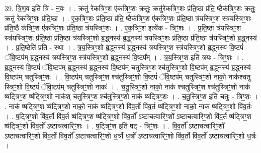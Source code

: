 \documentclass[17pt]{extarticle}
\begin{document}
39. त्रि॒ण॒व इति॑ त्रि - न॒वः । . क्रतु॑ रेकत्रिꣳ॒॒श ए॑कत्रिꣳ॒॒शः क्रतुः॒ क्रतु॑रेकत्रिꣳ॒॒शः प्र॑ति॒ष्ठा प्र॑ति॒ ष्ठैक॑त्रिꣳ॒॒शः क्रतुः॒ क्रतु॑ रेकत्रिꣳ॒॒शः प्र॑ति॒ष्ठा । . ए॒क॒त्रिꣳ॒॒शः प्र॑ति॒ष्ठा प्र॑ति॒ ष्ठैक॑त्रिꣳ॒॒श ए॑कत्रिꣳ॒॒शः प्र॑ति॒ष्ठा 
त्र॑यस्त्रिꣳ॒॒श स्त्र॑यस्त्रिꣳ॒॒शः प्र॑ति॒ष्ठै क॑त्रिꣳ॒॒श ए॑कत्रिꣳ॒॒शः प्र॑ति॒ष्ठा त्र॑यस्त्रिꣳ॒॒शः । . ए॒क॒त्रिꣳ॒॒श इत्ये॑क - त्रिꣳ॒॒शः । . प्र॒ति॒ष्ठा त्र॑यस्त्रिꣳ॒॒श स्त्र॑यस्त्रिꣳ॒॒शः प्र॑ति॒ष्ठा प्र॑ति॒ष्ठा त्र॑यस्त्रिꣳ॒॒शो ब्र॒द्ध्नस्य॑ ब्र॒द्ध्नस्य॑ त्रयस्त्रिꣳ॒॒शः प्र॑ति॒ष्ठा प्र॑ति॒ष्ठा त्र॑यस्त्रिꣳ॒॒शो ब्र॒द्ध्नस्य॑ । . प्र॒ति॒ष्ठेति॑ प्रति - स्था । . त्र॒य॒स्त्रिꣳ॒॒शो ब्र॒द्ध्नस्य॑ ब्र॒द्ध्नस्य॑ त्रयस्त्रिꣳ॒॒श स्त्र॑यस्त्रिꣳ॒॒शो ब्र॒द्ध्नस्य॑ वि॒ष्टपं॑ ॅवि॒ष्टप॑म् ब्र॒द्ध्नस्य॑ त्रयस्त्रिꣳ॒॒श स्त्र॑यस्त्रिꣳ॒॒शो ब्र॒द्ध्नस्य॑ वि॒ष्टप᳚म् । . त्र॒य॒स्त्रिꣳ॒॒श इति॑ त्रयः - त्रिꣳ॒॒शः । . ब्र॒द्ध्नस्य॑ वि॒ष्टपं॑ ॅवि॒ष्टप॑म् ब्र॒द्ध्नस्य॑ ब्र॒द्ध्नस्य॑ वि॒ष्टप॑म् चतुस्त्रिꣳ॒॒श श्च॑तुस्त्रिꣳ॒॒शो वि॒ष्टप॑म् ब्र॒द्ध्नस्य॑ ब्र॒द्ध्नस्य॑ वि॒ष्टप॑म् चतुस्त्रिꣳ॒॒शः । . वि॒ष्टप॑म् चतुस्त्रिꣳ॒॒श श्च॑तुस्त्रिꣳ॒॒शो वि॒ष्टपं॑ ॅवि॒ष्टप॑म् चतुस्त्रिꣳ॒॒शो नाको॒ नाक॑श्चतु स्त्रिꣳ॒॒शो वि॒ष्टपं॑ ॅवि॒ष्टप॑म् चतुस्त्रिꣳ॒॒शो नाकः॑ । . च॒तु॒स्त्रिꣳ॒॒शो नाको॒ नाक॑ श्चतुस्त्रिꣳ॒॒श श्च॑तुस्त्रिꣳ॒॒शो नाक॑ ष्षट्त्रिꣳ॒॒श ष्ष॑ट्त्रिꣳ॒॒शो नाक॑श् चतुस्त्रिꣳ॒॒श श्च॑तुस्त्रिꣳ॒॒शो नाक॑ ष्षट्त्रिꣳ॒॒शः । . च॒तु॒स्त्रिꣳ॒॒श इति॑ चतुः - त्रिꣳ॒॒शः । . नाक॑ ष्षट्त्रिꣳ॒॒श ष्ष॑ट्त्रिꣳ॒॒शो नाको॒ नाक॑ ष्षट्त्रिꣳ॒॒शो वि॑व॒र्तो वि॑व॒र्त ष्ष॑ट्त्रिꣳ॒॒शो नाको॒ नाक॑ ष्षट्त्रिꣳ॒॒शो वि॑व॒र्तः । . ष॒ट्त्रिꣳ॒॒शो वि॑व॒र्तो वि॑व॒र्त ष्ष॑ट्त्रिꣳ॒॒श ष्ष॑ट्त्रिꣳ॒॒शो वि॑व॒र्तो᳚ ऽष्टाचत्वारिꣳ॒॒शो᳚ ऽष्टाचत्वारिꣳ॒॒शो वि॑व॒र्त ष्ष॑ट्त्रिꣳ॒॒श ष्ष॑ट्त्रिꣳ॒॒शो वि॑व॒र्तो᳚ ऽष्टाचत्वारिꣳ॒॒शः । . ष॒ट्त्रिꣳ॒॒श इति॑ षट् - त्रिꣳ॒॒शः । . वि॒व॒र्तो᳚ ऽष्टाचत्वारिꣳ॒॒शो᳚ ऽष्टाचत्वारिꣳ॒॒शो वि॑व॒र्तो वि॑व॒र्तो᳚ ऽष्टाचत्वारिꣳ॒॒शो ध॒र्त्रो ध॒र्त्रो᳚ ऽष्टाचत्वारिꣳ॒॒शो वि॑व॒र्तो वि॑व॒र्तो᳚ ऽष्टाचत्वारिꣳ॒॒शो ध॒र्त्रः । \newline
\end{document}
